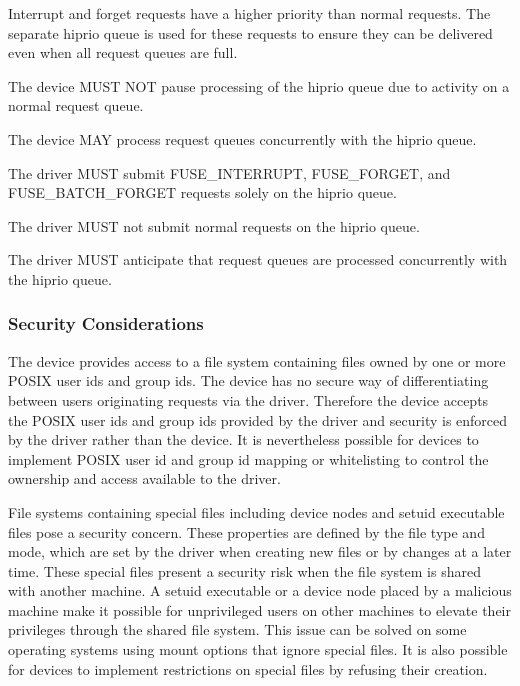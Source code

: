 Interrupt and forget requests have a higher priority than normal requests.  The
separate hiprio queue is used for these requests to ensure they can be
delivered even when all request queues are full.


The device MUST NOT pause processing of the hiprio queue due to activity on a
normal request queue.

The device MAY process request queues concurrently with the hiprio queue.


The driver MUST submit FUSE\_INTERRUPT, FUSE\_FORGET, and FUSE\_BATCH\_FORGET requests solely on the hiprio queue.

The driver MUST not submit normal requests on the hiprio queue.

The driver MUST anticipate that request queues are processed concurrently with the hiprio queue.

\subsubsection{Security Considerations}\label{sec:Device Types / File System Device / Security Considerations}

The device provides access to a file system containing files owned by one or
more POSIX user ids and group ids.  The device has no secure way of
differentiating between users originating requests via the driver.  Therefore
the device accepts the POSIX user ids and group ids provided by the driver and
security is enforced by the driver rather than the device.  It is nevertheless
possible for devices to implement POSIX user id and group id mapping or
whitelisting to control the ownership and access available to the driver.

File systems containing special files including device nodes and setuid
executable files pose a security concern.  These properties are defined by the
file type and mode, which are set by the driver when creating new files or by
changes at a later time.  These special files present a security risk when the
file system is shared with another machine.  A setuid executable or a device
node placed by a malicious machine make it possible for unprivileged users on
other machines to elevate their privileges through the shared file system.
This issue can be solved on some operating systems using mount options that
ignore special files.  It is also possible for devices to implement
restrictions on special files by refusing their creation.

